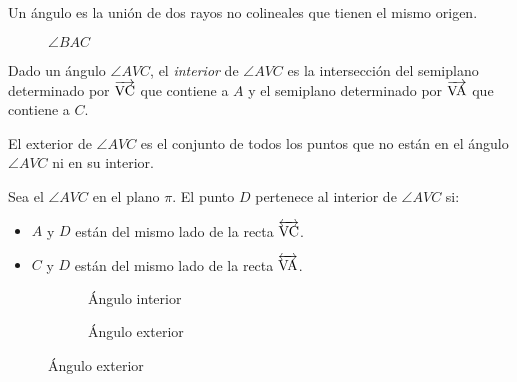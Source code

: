 \begin{definition}
Un ángulo es la unión de dos rayos no colineales que tienen el mismo origen.

\begin{figure}[!h]
    \centering
    
    \label{fig:angle}
    \caption{$\angle{BAC}$}
\end{figure}

\end{definition}

\begin{definition}
Dado un ángulo $\angle{AVC}$, el \textit{interior} de $\angle{AVC}$ es la intersección del semiplano determinado por $\overrightarrow{\rm VC}$ que contiene a $A$ y el semiplano determinado por $\overrightarrow{\rm VA}$ que contiene a $C$.

\end{definition}

\begin{definition}
El exterior de $\angle{AVC}$ es el conjunto de todos los puntos que no están en el ángulo $\angle{AVC}$ ni en su interior.
\end{definition}
    
\begin{definition}
Sea el $\angle{AVC}$ en el plano $\pi$. El punto $D$ pertenece al interior de $\angle{AVC}$ si:

\begin{itemize}
    \item $A$ y $D$ están del mismo lado de la recta $\overleftrightarrow{\rm VC}$.
    \item $C$ y $D$ están del mismo lado de la recta $\overleftrightarrow{\rm VA}$.
\end{itemize}

\begin{figure}[h!]
    \centering
    \begin{subfigure}[b]{.5\textwidth}
        \centering
        
        \caption{Ángulo interior}
        \label{fig:angle-interior}
    \end{subfigure}%
    \begin{subfigure}[b]{.5\textwidth}
        \centering
        
        \caption{Ángulo exterior}
        \label{fig:angle-exterior}
    \end{subfigure}
    \centering
    \label{fig:angle-int-ext}
\end{figure}    

\end{definition}

